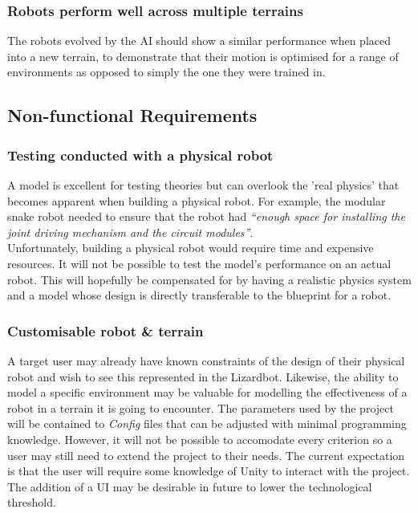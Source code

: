 \documentclass{article}
\begin{document}
\subsubsection{Robots perform well across multiple terrains}
The robots evolved by the AI should show a similar performance when placed into a new terrain, to demonstrate that their motion is optimised for a range of environments as opposed to simply the one they were trained in.

\subsection{Non-functional Requirements}
\subsubsection{Testing conducted with a physical robot}
A model is excellent for testing theories but can overlook the 'real physics' that becomes apparent when building a physical robot. For example, the modular snake robot needed to ensure that the robot had \textit{“enough space for installing the joint driving mechanism and the circuit modules”}.  \\
Unfortunately, building a physical robot would require time and expensive resources. It will not be possible to test the model’s performance on an actual robot. This will hopefully be compensated for by having a realistic physics system and a model whose design is directly transferable to the blueprint for a robot.

\subsubsection{Customisable robot \& terrain}
A target user may already have known constraints of the design of their physical robot and wish to see this represented in the Lizardbot. Likewise, the ability to model a specific environment may be valuable for modelling the effectiveness of a robot in a terrain it is going to encounter.
The parameters used by the project will be contained to \textit{Config} files that can be adjusted with minimal programming knowledge. However, it will not be possible to accomodate every criterion so a user may still need to extend the project to their needs. 
The current expectation is that the user will require some knowledge of Unity to interact with the project. The addition of a UI may be desirable in future to lower the technological threshold. 
\end{document}
